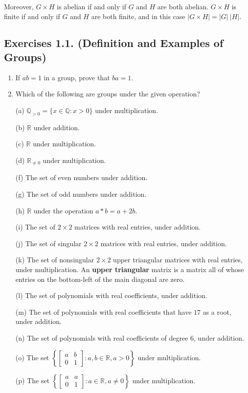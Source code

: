\documentclass[leqno]{book}
\begin{document}
Moreover, $G\times H$ is abelian if and only if $G$ and $H$ are both abelian.  $G\times H$ is finite if and only if $G$ and $H$ are both finite, and in this case $|G\times H|=|G|~|H|$.

\subsection*{Exercises 1.1. (Definition and Examples of Groups)}
\begin{enumerate}
\item If $ab=1$ in a group, prove that $ba=1$.

\item Which of the following are groups under the given operation?

(a) $\mathbb Q_{>0}=\{x\in\mathbb Q:x>0\}$ under multiplication.

(b) $\mathbb R$ under addition.

(c) $\mathbb R$ under multiplication.

(d) $\mathbb R_{\ne 0}$ under multiplication.

(f) The set of even numbers under addition.

(g) The set of odd numbers under addition.

(h) $\mathbb R$ under the operation $a*b=a+2b$.

(i) The set of $2\times 2$ matrices with real entries, under addition.

(j) The set of singular $2\times 2$ matrices with real entries, under addition.

(k) The set of nonsingular $2\times 2$ upper triangular matrices with real entries, under multiplication.  An \textbf{upper triangular} matrix is a matrix all of whose entries on the bottom-left of the main diagonal are zero.

(l) The set of polynomials with real coefficients, under addition.

(m) The set of polynomials with real coefficients that have $17$ as a root, under addition.

(n) The set of polynomials with real coefficients of degree $6$, under addition.

(o) The set $\left\{\begin{bmatrix}a&b\\0&1\end{bmatrix}:a,b\in\mathbb R,a>0\right\}$ under multiplication.

(p) The set $\left\{\begin{bmatrix}a&a\\0&1\end{bmatrix}:a\in\mathbb R,a\ne 0\right\}$ under multiplication.


\end{enumerate}
\end{document}
